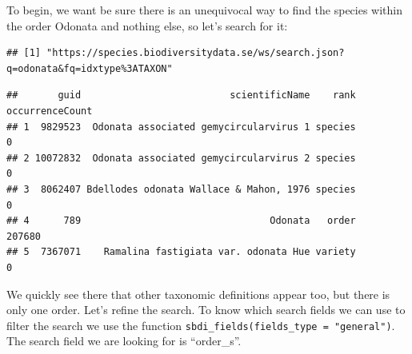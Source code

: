 \documentclass[
  10pt,
]{article}
\newenvironment{Shaded}{\begin{snugshade}}{\end{snugshade}}
\newcommand{\AttributeTok}[1]{\textcolor[rgb]{0.77,0.63,0.00}{#1}}
\newcommand{\DecValTok}[1]{\textcolor[rgb]{0.00,0.00,0.81}{#1}}
\newcommand{\FunctionTok}[1]{\textcolor[rgb]{0.00,0.00,0.00}{#1}}
\newcommand{\NormalTok}[1]{#1}
\newcommand{\OtherTok}[1]{\textcolor[rgb]{0.56,0.35,0.01}{#1}}
\newcommand{\SpecialCharTok}[1]{\textcolor[rgb]{0.00,0.00,0.00}{#1}}
\newcommand{\StringTok}[1]{\textcolor[rgb]{0.31,0.60,0.02}{#1}}
\begin{document}
To begin, we want be sure there is an unequivocal way to find the species within
the order Odonata and nothing else, so let's search for it:

\begin{Shaded}
\end{Shaded}

\begin{verbatim}
## [1] "https://species.biodiversitydata.se/ws/search.json?q=odonata&fq=idxtype%3ATAXON"
\end{verbatim}

\begin{verbatim}
##       guid                          scientificName    rank occurrenceCount
## 1  9829523  Odonata associated gemycircularvirus 1 species               0
## 2 10072832  Odonata associated gemycircularvirus 2 species               0
## 3  8062407 Bdellodes odonata Wallace & Mahon, 1976 species               0
## 4      789                                 Odonata   order          207680
## 5  7367071    Ramalina fastigiata var. odonata Hue variety               0
\end{verbatim}

We quickly see there that other taxonomic definitions appear too, but there is
only one order. Let's refine the search. To know which search fields we can use
to filter the search we use the function \texttt{sbdi\_fields(fields\_type\ =\ "general")}.
The search field we are looking for is ``order\_s''.

\begin{Shaded}
\end{Shaded}
\end{document}
